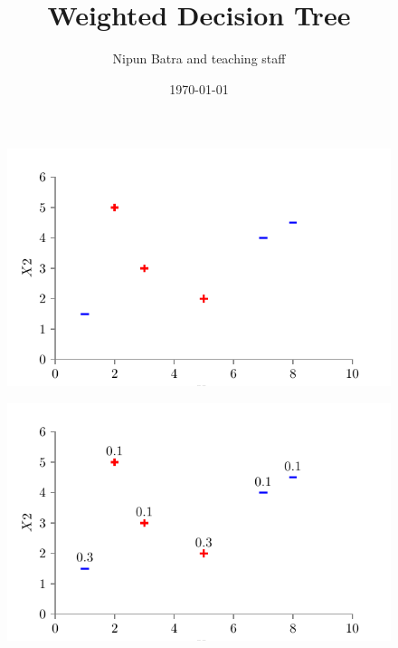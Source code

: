 \documentclass[usenames,dvipsnames]{beamer}
\title{Weighted Decision Tree}
\date{\today}
\author{Nipun Batra and teaching staff}
\institute{IIT Gandhinagar}
\begin{document}
	\maketitle
	
	

\begin{frame}

\begin{figure}
	\centering
	\includegraphics{../figures/dt_weighted/fig1.pdf}
\end{figure}


\end{frame}


\begin{frame}

\begin{figure}
	\centering
	\includegraphics{../figures/dt_weighted/fig2.pdf}
\end{figure}


\end{frame}
\end{document}
